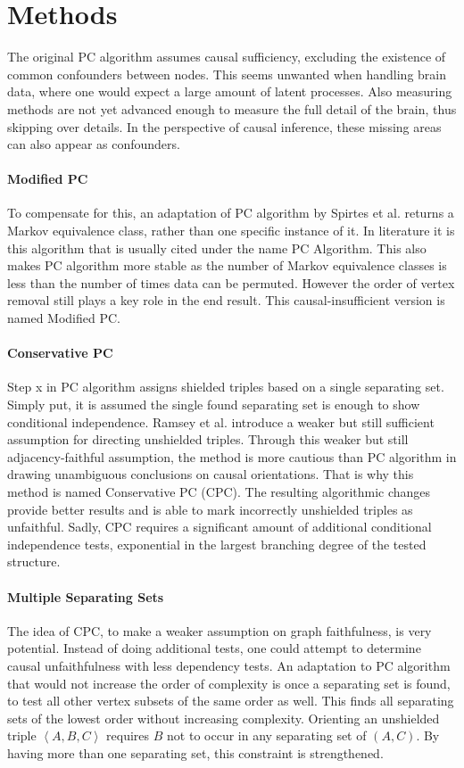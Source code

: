 \documentclass[a4paper, 10pt, english, onecolumn]{article}
\begin{document}
\section{Methods}
The original PC algorithm assumes causal sufficiency, excluding the existence of common confounders between nodes.
This seems unwanted when handling brain data, where one would expect a large amount of latent processes.
Also measuring methods are not yet advanced enough to measure the full detail of the brain, thus skipping over details.
In the perspective of causal inference, these missing areas can also appear as confounders.

\paragraph{Modified PC}
To compensate for this, an adaptation of PC algorithm by Spirtes et al. returns a Markov equivalence class, rather than one specific instance of it.
In literature it is this algorithm that is usually cited under the name PC Algorithm.
This also makes PC algorithm more stable as the number of Markov equivalence classes is less than the number of times data can be permuted.
However the order of vertex removal still plays a key role in the end result.
This causal-insufficient version is named Modified PC.

\paragraph{Conservative PC}
Step x in PC algorithm assigns shielded triples based on a single separating set. %
Simply put, it is assumed the single found separating set is enough to show conditional independence. 
Ramsey et al. \cite{ramsey2012} introduce a weaker but still sufficient assumption for directing unshielded triples.
Through this weaker but still adjacency-faithful assumption, the method is more cautious than PC algorithm in drawing unambiguous conclusions on causal orientations.
That is why this method is named Conservative PC (CPC).
The resulting algorithmic changes provide better results and is able to mark incorrectly unshielded triples as unfaithful.
Sadly, CPC requires a significant amount of additional conditional independence tests, exponential in the largest branching degree of the tested structure.

\paragraph{Multiple Separating Sets}
The idea of CPC, to make a weaker assumption on graph faithfulness, is very potential.
Instead of doing additional tests, one could attempt to determine causal unfaithfulness with less dependency tests.
An adaptation to PC algorithm that would not increase the order of complexity is once a separating set is found, to test all other vertex subsets of the same order as well.
This finds all separating sets of the lowest order without increasing complexity.
Orienting an unshielded triple $\left<A,B,C\right>$ requires $B$ not to occur in any separating set of $(A,C)$.
By having more than one separating set, this constraint is strengthened.
\end{document}
